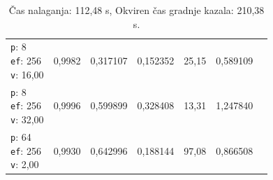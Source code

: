 \begin{table}[htbp]
\begin{tabularx}{\textwidth}{Xrrrrrr}
    \makecell{\texttt{p}: 8\\\texttt{ef}: 256\\\texttt{v}: 16,00} & 0,9982 & 0,317107 & 0,152352 & 25,15 & 0,589109 \\
    \makecell{\texttt{p}: 8\\\texttt{ef}: 256\\\texttt{v}: 32,00} & 0,9996 & 0,599899 & 0,328408 & 13,31 & 1,247840 \\
    \makecell{\texttt{p}: 64\\\texttt{ef}: 256\\\texttt{v}: 2,00} & 0,9930 & 0,642996 & 0,188144 & 97,08 & 0,866508 \\
    \bottomrule
  \end{tabularx}
\caption* {Čas nalaganja: 112,48 s, Okviren čas gradnje kazala: 210,38 s.}\end{table}

